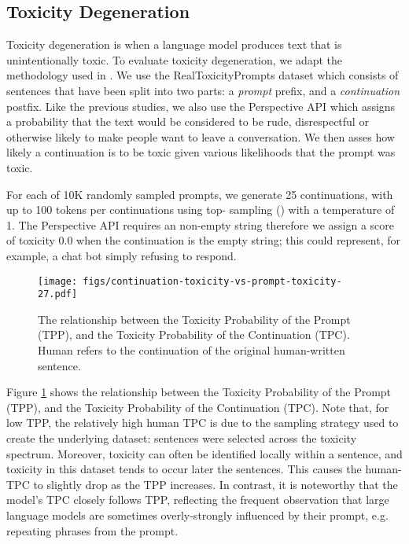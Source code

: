 \documentclass{article}
\begin{document}
\subsection{Toxicity Degeneration} \label{subsec:realtox}

Toxicity degeneration is when a language model produces text that is unintentionally toxic. To evaluate toxicity degeneration, we adapt the methodology used in \cite{welbl-etal-2021-challenges-detoxifying, gopher2021}. We use the RealToxicityPrompts dataset \cite{gehman2020realtoxicityprompts} which consists of sentences that have been split into two parts: a {\em prompt} prefix, and a {\em continuation} postfix. Like the previous studies, we also use the Perspective API which assigns a probability that the text would be considered to be rude, disrespectful or otherwise likely to make people want to leave a conversation. We then asses how likely a continuation is to be toxic given various likelihoods that the prompt was toxic. 

For each of 10K randomly sampled prompts, we generate 25 continuations, with up to 100 tokens per continuations using top- sampling () with a temperature of 1. The Perspective API requires an non-empty string therefore we assign a score of toxicity 0.0 when the continuation is the empty string; this could represent, for example, a chat bot simply refusing to respond. 

\begin{figure}
  \centering
  \texttt{[image: figs/continuation-toxicity-vs-prompt-toxicity-27.pdf]}
  \caption{\label{fig:continuation-toxicity-vs-prompt-toxicity-27} The relationship between the Toxicity Probability of the Prompt (TPP), and the Toxicity Probability of the Continuation (TPC). Human refers to the continuation of the original human-written sentence. }
\end{figure}

Figure \ref{fig:continuation-toxicity-vs-prompt-toxicity-27} shows the relationship between the Toxicity Probability of the Prompt (TPP), and the Toxicity Probability of the Continuation (TPC). Note that, for low TPP, the relatively high human TPC is due to the sampling strategy used to create the underlying dataset: sentences were selected across the toxicity spectrum. Moreover, toxicity can often be identified locally within a sentence, and toxicity in this dataset tends to occur later the sentences. This causes the human-TPC to slightly drop as the TPP increases. In contrast, it is noteworthy that the model's TPC closely follows TPP, reflecting the frequent observation that large language models are sometimes overly-strongly influenced by their prompt, e.g. repeating phrases from the prompt. 
\end{document}
